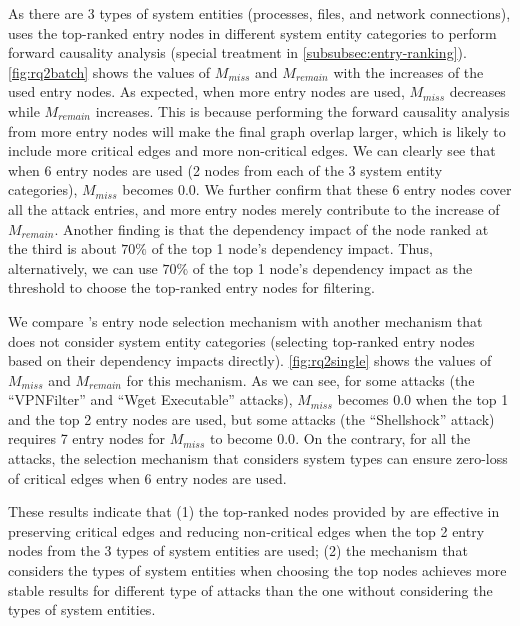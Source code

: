 
As there are 3 types of system entities (\ie processes, files, and network connections), \tool uses the top-ranked entry nodes in different system entity categories
to perform forward causality analysis (\ie special treatment in \cref{subsubsec:entry-ranking}). 
\cref{fig:rq2batch} shows the values of $M_{miss}$ and $M_{remain}$ with the increases of the used entry nodes.
As expected, when more entry nodes are used, $M_{miss}$ decreases while $M_{remain}$ increases.
This is because performing the forward causality analysis from more entry nodes will make the final graph overlap larger, which is likely to include more critical edges and more non-critical edges. 
We can clearly see that when 6 entry nodes are used (2 nodes from each of the 3 system entity categories), $M_{miss}$ becomes $0.0$.
We further confirm that these 6 entry nodes cover all the attack entries, and more entry nodes merely contribute to the increase of $M_{remain}$.
Another finding is that the dependency impact of the node ranked at the third is about $70\%$ of the top 1 node's dependency impact.
Thus, alternatively, we can use $70\%$ of the top 1 node's dependency impact as the threshold to choose the top-ranked entry nodes for filtering.


We compare \tool's entry node selection mechanism with another mechanism that does not consider system entity categories (\ie selecting top-ranked entry nodes based on their dependency impacts directly).
\cref{fig:rq2single} shows the values of $M_{miss}$ and $M_{remain}$ for this mechanism.
As we can see, for some attacks (\eg the ``VPNFilter'' and ``Wget Executable'' attacks), $M_{miss}$ becomes $0.0$ when the top 1 and the top 2 entry nodes are used,
but some attacks (\eg the ``Shellshock'' attack) requires 7 entry nodes for $M_{miss}$ to become $0.0$.
On the contrary, for all the attacks, the selection mechanism that considers system types can ensure zero-loss of critical edges when 6 entry nodes are used.

These results indicate that (1) the top-ranked nodes provided by \tool are effective in preserving critical edges and reducing non-critical edges when the top 2 entry nodes from the 3 types of system entities are used;
(2) the mechanism that considers the types of system entities when choosing the top nodes achieves more stable results for different type of attacks than the one without considering the types of system entities.







